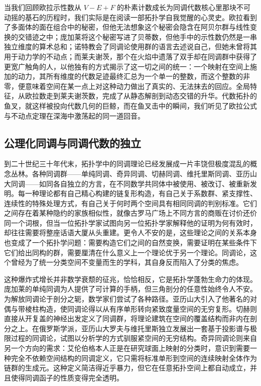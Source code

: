 \documentclass[12pt,a4paper]{article}
\begin{document}
当我们回顾欧拉示性数从 $V - E + F$ 的朴素计数成长为同调代数核心里那块不可动摇的基石的历程时，我们实际是在阅读一部拓扑学自我觉醒的心灵史。欧拉看到了多面体的面在组合中的秘密，但他无法想象这个秘密会隐含在阿贝尔群与线性变换的交错迹之中；庞加莱将这个秘密写进了贝蒂数，但他手中的示性数仍然是一串独立维度的算术总和；诺特教会了同调论使用群的语言去述说自己，但她未曾将其用于动力学的不动点；而莱夫谢茨，那个在火焰中遗落了双手却在同调群中获得了更宽广触角的人，以他独有的方式揭示了这一切之间的统一：一个映射在空间上施加的动力，其所有维度的代数足迹最终汇总为一个单一的整数，而这个整数的非零，便意味着空间在某一点上对这种动力做出了真实的、无法抹去的回应。全局特征，从欧拉数走到莱夫谢茨数，完成了从静态解剖到动态交错的升华。代数拓扑的鱼叉，就这样被投向代数几何的巨鲸，而在鱼叉击中的瞬间，我们听见了欧拉公式与不动点定理在深海中激荡起的同一道回音。

\subsection{公理化同调与同调代数的独立}

到二十世纪三十年代末，拓扑学中的同调理论已经发展成一片丰饶但极度混乱的概念丛林。各种同调群——单纯同调、奇异同调、切赫同调、维托里斯同调、亚历山大同调——如同各自独立的方言，在不同数学共同体中被使用、被改订、被重新发明。每一种理论都有自己精心构建的链复形构造，有自己关于系数群、紧支撑性、连续性的特殊处理方式，有自己关于何时两个空间具有相同同调的判别标准。它们之间存在着某种隐约的家族相似性，就像古罗马广场上不同方言的商贩在讨价还价同一个词根，但当一位拓扑学家试图向另一位拓扑学家解释他的证明为何有效时，却往往需要将整座话语大厦从头重建。更令人不安的是，这些理论之间的关系本身也变成了一个拓扑学问题：需要构造它们之间的自然变换，需要证明在某些条件下它们给出同构的群，需要厘清在什么意义上一个理论优于另一个理论。同调论，这个曾经为了统一分类空间不变量而生的学科，其自身反而陷入了分类的焦虑。

这种爆炸式增长并非数学衰颓的征兆，恰恰相反，它是拓扑学蓬勃生命力的体现。庞加莱的单纯同调为人提供了可计算的手柄，但三角剖分的任意性始终令人不安。为解放同调论于剖分之轭，数学家们尝试了各种路径。亚历山大引入了他著名的对偶与带棱柱构造，使同调论得以从有序单形转向紧致度量空间的无穷复形。切赫则直接从开复盖的神经出发定义了同调群，将理论建筑在空间的覆盖结构而非内在剖分之上。在俄罗斯学派，亚历山大罗夫与维托里斯独立发展出一套基于投影谱与极限过程的同调论，试图以分析学的方式驯服紧空间的无穷结构。奇异同调论则来自另一个方向的需求：艾伦伯格本人正是在研究球面上映射的分类时，意识到需要一种完全不依赖空间结构的同调定义，它只需将标准单形到空间的连续映射全体作为链群的生成元。这种定义简洁得近乎暴力，但它在任意拓扑空间上都自动成立，并且使得同调函子的性质变得完全透明。
\end{document}

